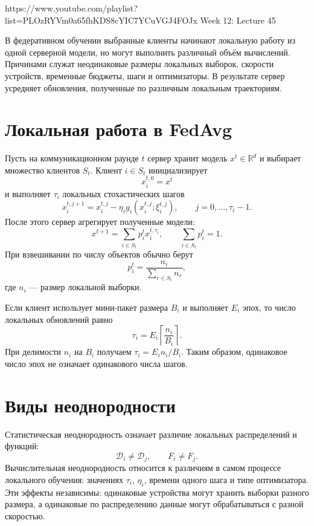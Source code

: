 
\sourcevideo
    {https://www.youtube.com/playlist?list=PLOzRYVm0a65fhKDS8cYIC7YCuVGJ4FOJx}
    {Week 12: Lecture 45}

В федеративном обучении выбранные клиенты начинают локальную работу
из одной серверной модели, но могут выполнить различный объём
вычислений. Причинами служат неодинаковые размеры локальных выборок,
скорости устройств, временные бюджеты, шаги и оптимизаторы. В
результате сервер усредняет обновления, полученные по различным
локальным траекториям.

\section{Локальная работа в FedAvg}

Пусть на коммуникационном раунде \(t\) сервер хранит модель
\(x^t\in\mathbb R^d\) и выбирает множество клиентов \(S_t\). Клиент
\(i\in S_t\) инициализирует
\[
    x_i^{t,0}=x^t
\]
и выполняет \(\tau_i\) локальных стохастических шагов
\[
    x_i^{t,j+1}
    =
    x_i^{t,j}
    -
    \eta_i g_i
    \left(
        x_i^{t,j};\xi_i^{t,j}
    \right),
    \qquad
    j=0,\ldots,\tau_i-1.
\]
После этого сервер агрегирует полученные модели:
\[
    x^{t+1}
    =
    \sum_{i\in S_t}p_i^t x_i^{t,\tau_i},
    \qquad
    \sum_{i\in S_t}p_i^t=1.
\]
При взвешивании по числу объектов обычно берут
\[
    p_i^t
    =
    \frac{n_i}{\sum_{r\in S_t}n_r},
\]
где \(n_i\) --- размер локальной выборки.

Если клиент использует мини-пакет размера \(B_i\) и выполняет
\(E_i\) эпох, то число локальных обновлений равно
\[
    \tau_i
    =
    E_i
    \left\lceil\frac{n_i}{B_i}\right\rceil.
\]
При делимости \(n_i\) на \(B_i\) получаем
\(\tau_i=E_in_i/B_i\). Таким образом, одинаковое число эпох не
означает одинакового числа шагов.

\section{Виды неоднородности}

Статистическая неоднородность означает различие локальных
распределений и функций:
\[
    \mathcal D_i\ne\mathcal D_j,
    \qquad
    F_i\ne F_j.
\]
Вычислительная неоднородность относится к различиям в самом процессе
локального обучения: значениях \(\tau_i\), \(\eta_i\), времени одного
шага и типе оптимизатора. Эти эффекты независимы: одинаковые
устройства могут хранить выборки разного размера, а одинаковые по
распределению данные могут обрабатываться с разной скоростью.

